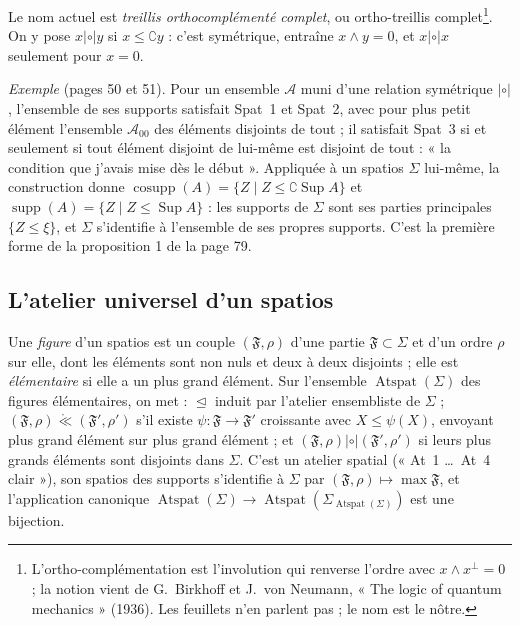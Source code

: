 \documentclass[11pt,a4paper]{article}
\begin{document}
Le nom actuel est \emph{treillis orthocomplémenté complet}, ou ortho-treillis
complet\footnote{L'ortho-complémentation est l'involution qui renverse l'ordre
avec $x \wedge x^{\perp} = 0$ ; la notion vient de G.~Birkhoff et J.~von Neumann,
« The logic of quantum mechanics » (1936). Les feuillets n'en parlent pas ; le
nom est le nôtre.}. On y pose $x \mathrel{|\circ|} y$ si $x \leq \complement y$ :
c'est symétrique, entraîne $x \wedge y = 0$, et $x \mathrel{|\circ|} x$ seulement
pour $x = 0$.

\emph{Exemple} (pages 50 et 51). Pour un ensemble $\mathcal{A}$ muni d'une
relation symétrique $\mathrel{|\circ|}$, l'ensemble de ses supports satisfait
Spat~1 et Spat~2, avec pour plus petit élément l'ensemble $\mathcal{A}_{00}$ des
éléments disjoints de tout ; il satisfait Spat~3 si et seulement si tout élément
disjoint de lui-même est disjoint de tout : « la condition que j'avais mise dès
le début ». Appliquée à un spatios $\Sigma$ lui-même, la construction donne
$\operatorname{cosupp}(A) = \{ Z \mid Z \leq \complement\operatorname{Sup}A\}$ et
$\operatorname{supp}(A) = \{ Z \mid Z \leq \operatorname{Sup}A\}$ : les supports
de $\Sigma$ sont ses parties principales $\{Z \leq \xi\}$, et $\Sigma$ s'identifie
à l'ensemble de ses propres supports. C'est la première forme de la proposition
1 de la page 79.

\subsection*{L'atelier universel d'un spatios}

Une \emph{figure} d'un spatios est un couple $(\mathfrak{F}, \rho)$ d'une partie
$\mathfrak{F} \subset \Sigma$ et d'un ordre $\rho$ sur elle, dont les éléments
sont non nuls et deux à deux disjoints ; elle est \emph{élémentaire} si elle a un
plus grand élément. Sur l'ensemble $\operatorname{Atspat}(\Sigma)$ des figures
élémentaires, on met : $\trianglelefteq$ induit par l'atelier ensembliste de
$\Sigma$ ; $(\mathfrak{F}, \rho) \mathrel{\mathring{\ll}} (\mathfrak{F}', \rho')$
s'il existe $\psi : \mathfrak{F} \to \mathfrak{F}'$ croissante avec $X \leq
\psi(X)$, envoyant plus grand élément sur plus grand élément ; et
$(\mathfrak{F}, \rho) \mathrel{|\circ|} (\mathfrak{F}', \rho')$ si leurs plus
grands éléments sont disjoints dans $\Sigma$. C'est un atelier spatial (« At~1
\ldots\ At~4 clair »), son spatios des supports s'identifie à $\Sigma$ par
$(\mathfrak{F}, \rho) \mapsto \max \mathfrak{F}$, et l'application canonique
$\operatorname{Atspat}(\Sigma) \to \operatorname{Atspat}(\Sigma_{\operatorname{Atspat}(\Sigma)})$
est une bijection.
\end{document}
